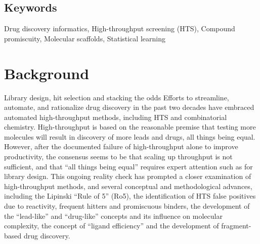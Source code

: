 \subsection{Keywords}

Drug discovery informatics, High-throughput screening (HTS), Compound promiscuity, Molecular scaffolds, Statistical learning

\section{Background}

Library design, hit selection and stacking the odds
Efforts to streamline, automate, and rationalize drug discovery in the past two decades have embraced automated high-throughput methods, including HTS and combinatorial chemistry. High-throughput is based on the reasonable premise that testing more molecules will result in discovery of more leads and drugs, all things being equal. However, after the documented failure of high-throughput alone to improve productivity, the consensus seems to be that scaling up throughput is not sufficient, and that “all things being equal” requires expert attention such as for library design. This ongoing reality check has prompted a closer examination of high-throughput methods, and several conceptual and methodological advances, including the Lipinski “Rule of 5” (Ro5)\cite{Lipinski1997-vm}, the identification of HTS false positives due to reactivity\cite{Rishton1997-ns}, frequent hitters\cite{Roche2002-ii} and promiscuous binders\cite{McGovern2003-nc,Seidler2003-na}, the development of the “lead-like” and “drug-like” concepts\cite{Teague1999-ce,Oprea2010-kd,Ajay1998-ju,Sadowski1998-uq} and its influence on molecular complexity\cite{Hann2001-qd}, the concept of “ligand efficiency”\cite{Hopkins2004-qj} and the development of fragment-based drug discovery\cite{Jahnke2006-zd,Hajduk2007-ry}.

